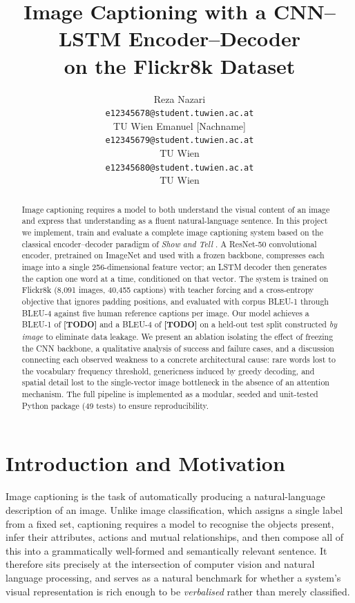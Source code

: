 \documentclass{article}
\title{Image Captioning with a CNN--LSTM Encoder--Decoder\\
       on the Flickr8k Dataset}
\author{%
  Reza Nazari \\
  \texttt{e12345678@student.tuwien.ac.at} \\
  TU Wien
  \And
  Emanuel [Nachname] \\
  \texttt{e12345679@student.tuwien.ac.at} \\
  TU Wien
  \And
  [Vorname Nachname] \\
  \texttt{e12345680@student.tuwien.ac.at} \\
  TU Wien
}
\begin{document}
\maketitle

\begin{abstract}
Image captioning requires a model to both understand the visual content of an
image and express that understanding as a fluent natural-language sentence. In
this project we implement, train and evaluate a complete image captioning system
based on the classical encoder--decoder paradigm of \emph{Show and Tell}
\citep{vinyals2015show}. A ResNet-50 convolutional encoder, pretrained on
ImageNet and used with a frozen backbone, compresses each image into a single
256-dimensional feature vector; an LSTM decoder then generates the caption one
word at a time, conditioned on that vector. The system is trained on Flickr8k
(8{,}091 images, 40{,}455 captions) with teacher forcing and a cross-entropy
objective that ignores padding positions, and evaluated with corpus BLEU-1
through BLEU-4 against five human reference captions per image. Our model
achieves a BLEU-1 of \textbf{[TODO]} and a BLEU-4 of \textbf{[TODO]} on a
held-out test split constructed \emph{by image} to eliminate data leakage. We
present an ablation isolating the effect of freezing the CNN backbone, a
qualitative analysis of success and failure cases, and a discussion connecting
each observed weakness to a concrete architectural cause: rare words lost to the
vocabulary frequency threshold, genericness induced by greedy decoding, and
spatial detail lost to the single-vector image bottleneck in the absence of an
attention mechanism. The full pipeline is implemented as a modular, seeded and
unit-tested Python package (49 tests) to ensure reproducibility.
\end{abstract}

\section{Introduction and Motivation}

Image captioning is the task of automatically producing a natural-language
description of an image. Unlike image classification, which assigns a single
label from a fixed set, captioning requires a model to recognise the objects
present, infer their attributes, actions and mutual relationships, and then
compose all of this into a grammatically well-formed and semantically relevant
sentence. It therefore sits precisely at the intersection of computer vision and
natural language processing, and serves as a natural benchmark for whether a
system's visual representation is rich enough to be \emph{verbalised} rather than
merely classified.
\end{document}
